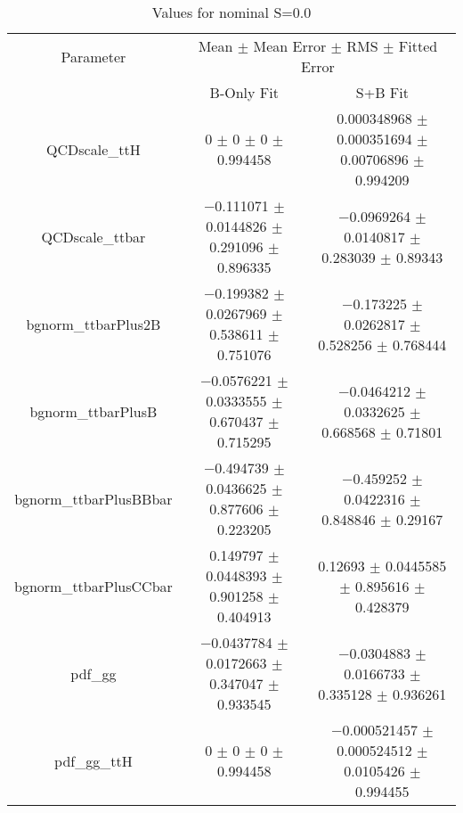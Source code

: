 \begin{table}
\centering
\caption{Values for nominal S=0.0}
\begin{tabular}{ccc}
\toprule
Parameter & \multicolumn{2}{c}{Mean $\pm$ Mean Error $\pm$ RMS $\pm$ Fitted Error}\\
 & B-Only Fit & S+B Fit\\
\midrule
QCDscale\_ttH & \num{0} $\pm$ \num{0} $\pm$ \num{0} $\pm$ \num{0.994458} & \num{0.000348968} $\pm$ \num{0.000351694} $\pm$ \num{0.00706896} $\pm$ \num{0.994209}\\
QCDscale\_ttbar & \num{-0.111071} $\pm$ \num{0.0144826} $\pm$ \num{0.291096} $\pm$ \num{0.896335} & \num{-0.0969264} $\pm$ \num{0.0140817} $\pm$ \num{0.283039} $\pm$ \num{0.89343}\\
bgnorm\_ttbarPlus2B & \num{-0.199382} $\pm$ \num{0.0267969} $\pm$ \num{0.538611} $\pm$ \num{0.751076} & \num{-0.173225} $\pm$ \num{0.0262817} $\pm$ \num{0.528256} $\pm$ \num{0.768444}\\
bgnorm\_ttbarPlusB & \num{-0.0576221} $\pm$ \num{0.0333555} $\pm$ \num{0.670437} $\pm$ \num{0.715295} & \num{-0.0464212} $\pm$ \num{0.0332625} $\pm$ \num{0.668568} $\pm$ \num{0.71801}\\
bgnorm\_ttbarPlusBBbar & \num{-0.494739} $\pm$ \num{0.0436625} $\pm$ \num{0.877606} $\pm$ \num{0.223205} & \num{-0.459252} $\pm$ \num{0.0422316} $\pm$ \num{0.848846} $\pm$ \num{0.29167}\\
bgnorm\_ttbarPlusCCbar & \num{0.149797} $\pm$ \num{0.0448393} $\pm$ \num{0.901258} $\pm$ \num{0.404913} & \num{0.12693} $\pm$ \num{0.0445585} $\pm$ \num{0.895616} $\pm$ \num{0.428379}\\
pdf\_gg & \num{-0.0437784} $\pm$ \num{0.0172663} $\pm$ \num{0.347047} $\pm$ \num{0.933545} & \num{-0.0304883} $\pm$ \num{0.0166733} $\pm$ \num{0.335128} $\pm$ \num{0.936261}\\
pdf\_gg\_ttH & \num{0} $\pm$ \num{0} $\pm$ \num{0} $\pm$ \num{0.994458} & \num{-0.000521457} $\pm$ \num{0.000524512} $\pm$ \num{0.0105426} $\pm$ \num{0.994455}\\
\bottomrule
\end{tabular}
\end{table}